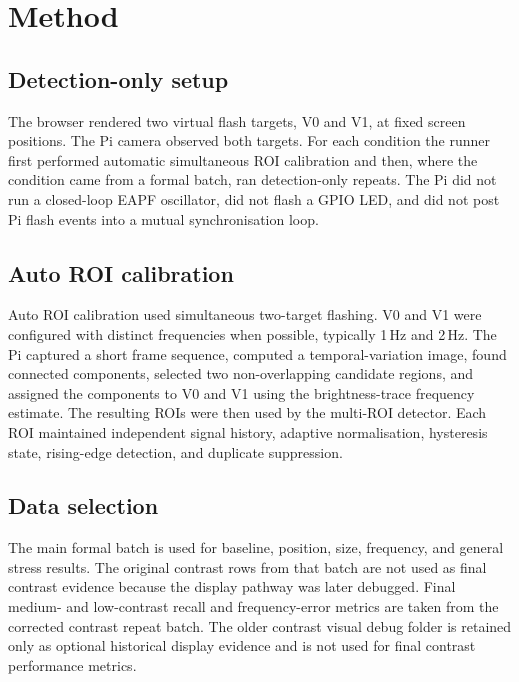 \documentclass[11pt,a4paper]{article}
\newcommand{\tabledir}{tables}
\begin{document}
\section{Method}

\subsection{Detection-only setup}

The browser rendered two virtual flash targets, V0 and V1, at fixed screen
positions. The Pi camera observed both targets. For each condition the runner
first performed automatic simultaneous ROI calibration and then, where the
condition came from a formal batch, ran detection-only repeats. The Pi did not
run a closed-loop EAPF oscillator, did not flash a GPIO LED, and did not post
Pi flash events into a mutual synchronisation loop.

\subsection{Auto ROI calibration}

Auto ROI calibration used simultaneous two-target flashing. V0 and V1 were
configured with distinct frequencies when possible, typically 1\,Hz and
2\,Hz. The Pi captured a short frame sequence, computed a temporal-variation
image, found connected components, selected two non-overlapping candidate
regions, and assigned the components to V0 and V1 using the brightness-trace
frequency estimate. The resulting ROIs were then used by the multi-ROI detector.
Each ROI maintained independent signal history, adaptive normalisation,
hysteresis state, rising-edge detection, and duplicate suppression.

\subsection{Data selection}



The main formal batch is used for baseline, position, size, frequency, and
general stress results. The original contrast rows from that batch are not used
as final contrast evidence because the display pathway was later debugged.
Final medium- and low-contrast recall and frequency-error metrics are taken
from the corrected contrast repeat batch. The older contrast visual debug
folder is retained only as optional historical display evidence and is not used
for final contrast performance metrics.
\end{document}

